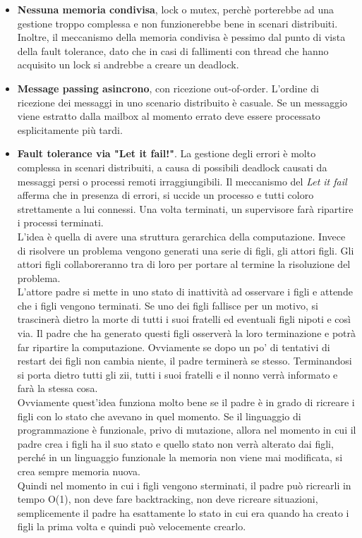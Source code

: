 \documentclass{article}
\begin{document}
\begin{itemize}
    \item \textbf{Nessuna memoria condivisa}, lock o mutex, perchè porterebbe ad una gestione troppo complessa e non funzionerebbe bene in scenari distribuiti. Inoltre, il meccanismo della memoria condivisa è pessimo dal punto di vista della fault tolerance, dato che in casi di fallimenti con thread che hanno acquisito un lock si andrebbe a creare un deadlock.
    \item \textbf{Message passing asincrono}, con ricezione out-of-order. L'ordine di ricezione dei messaggi in uno scenario distribuito è casuale. Se un messaggio viene estratto dalla mailbox al momento errato deve essere processato esplicitamente più tardi.
    \item \textbf{Fault tolerance via "Let it fail!"}. La gestione degli errori è molto complessa in scenari distribuiti, a causa di possibili deadlock causati da messaggi persi o processi remoti irraggiungibili. Il meccanismo del \textit{Let it fail} afferma che in presenza di errori, si uccide un processo e tutti coloro strettamente a lui connessi. Una volta terminati, un supervisore farà ripartire i processi terminati.\\
    L'idea è quella di avere una struttura gerarchica della computazione. Invece di risolvere un problema vengono generati una serie di figli, gli attori figli. Gli attori figli collaboreranno tra di loro per portare al termine la risoluzione del problema.\\
    L'attore padre si mette in uno stato di inattività ad osservare i figli e attende che i figli vengono terminati. Se uno dei figli fallisce per un motivo, si trascinerà dietro la morte di tutti i suoi fratelli ed eventuali figli nipoti e così via. Il padre che ha generato questi figli osserverà la loro terminazione e potrà far ripartire la computazione. Ovviamente se dopo un po' di tentativi di restart dei figli non cambia niente, il padre terminerà se stesso. Terminandosi si porta dietro tutti gli zii, tutti i suoi fratelli e il nonno verrà informato e farà la stessa cosa.\\
    Ovviamente quest'idea funziona molto bene se il padre è in grado di ricreare i figli con lo stato che avevano in quel momento. Se il linguaggio di programmazione è funzionale, privo di mutazione, allora nel momento in cui il padre crea i figli ha il suo stato e quello stato non verrà alterato dai figli, perché in un linguaggio funzionale la memoria non viene mai modificata, si crea sempre memoria nuova.\\
    Quindi nel momento in cui i figli vengono sterminati, il padre può ricrearli in tempo O(1), non deve fare backtracking, non deve ricreare situazioni, semplicemente il padre ha esattamente lo stato in cui era quando ha creato i figli la prima volta e quindi può velocemente crearlo. 
\end{itemize}
\end{document}
